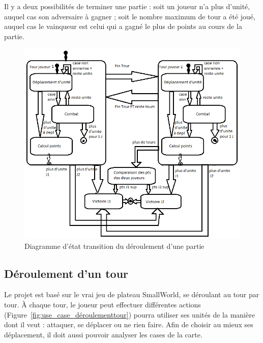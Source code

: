 \documentclass[a4paper]{article}%
\begin{document}
\medskip

	Il y a deux possibilités de terminer une partie : soit un joueur n'a plus d'unité, auquel cas son adversaire à gagner ; soit le nombre maximum de tour a été joué, auquel cas le vainqueur est celui qui a gagné le plus de points au cours de la partie.

\begin{figure}[H]
   \centering
   \includegraphics[width=\textwidth]{./images/state_transition/DiagEtatTransitionPartie.png}
                \caption{Diagramme d'état transition du déroulement d'une partie}
                \label{fig:state_transition_deroulementpartie}
\end{figure}

\newpage

\subsection{Déroulement d'un tour}
Le projet est basé sur le vrai jeu de plateau SmallWorld, se déroulant au tour par tour. À chaque tour, le joueur peut effectuer différentes actions (Figure~\ref{fig:use_case_déroulementtour}) pourra utiliser ses unités de la manière dont il veut : attaquer, se déplacer ou ne rien faire. Afin de choisir au mieux ses déplacement, il doit aussi pouvoir analyser les cases de la carte.
\end{document}
